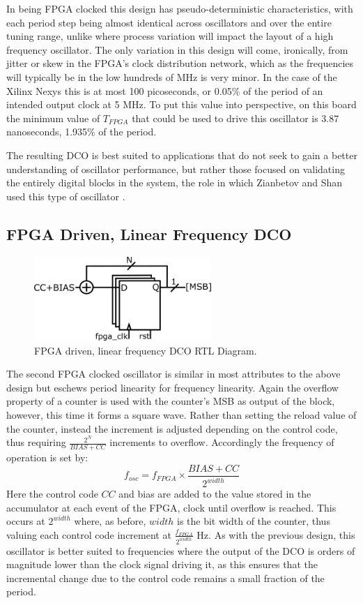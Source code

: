 In being \ac{FPGA} clocked this design has pseudo-deterministic characteristics, with each period step being almost identical across oscillators and over the entire tuning range, unlike  where process variation will impact the layout of a high frequency oscillator. The only variation in this design will come, ironically, from jitter or skew in the \ac{FPGA}'s clock distribution network, which as the frequencies will typically be in the low hundreds of MHz is very minor. In the case of the Xilinx \acl*{Nexys} this is at most 100 picoseconds, or 0.05\% of the period of an intended output clock at 5 MHz. To put this value into perspective, on this board the minimum value of $T_{FPGA}$ that could be used to drive this oscillator is 3.87 nanoseconds, 1.935\% of the period.

The resulting \ac{DCO} is best suited to applications that do not seek to gain a better understanding of oscillator performance, but rather those focused on validating the entirely digital blocks in the system, the role in which Zianbetov and Shan used this type of oscillator \cite{zianbetov2013phd,shan2014phd}.

\subsection{\acs{FPGA} Driven, Linear Frequency \acs{DCO}}
\begin{figure}[h]
	\centering
	\includegraphics[width=0.6\textwidth]{../osc2}
	\caption{\acs{FPGA} driven, linear frequency \acs{DCO} \ac{RTL} Diagram.}
	\label{fig:osc2}
\end{figure}
The second \ac{FPGA} clocked oscillator is similar in most attributes to the above design but eschews period linearity for frequency linearity. Again the overflow property of a counter is used with the counter's \ac{MSB} as output of the block, however, this time it forms a square wave. Rather than setting the reload value of the counter, instead the increment is adjusted depending on the control code, thus requiring $\frac{2^N}{BIAS+CC}$ increments to overflow. Accordingly the frequency of operation is set by:
\begin{equation}
	f_{osc} = f_{FPGA}\times\frac{BIAS+CC}{2^{width}}
\end{equation}
Here the control code $CC$ and bias are added to the value stored in the accumulator at each event of the \ac{FPGA}, clock until overflow is reached. This occurs at $2^{width}$ where, as before, $width$ is the bit width of the counter, thus valuing each control code increment at $\frac{f_{FPGA}}{2^{width}}$ Hz. As with the previous design, this oscillator is better suited to frequencies where the output of the \ac{DCO} is orders of magnitude lower than the clock signal driving it, as this ensures that the incremental change due to the control code remains a small fraction of the period.

